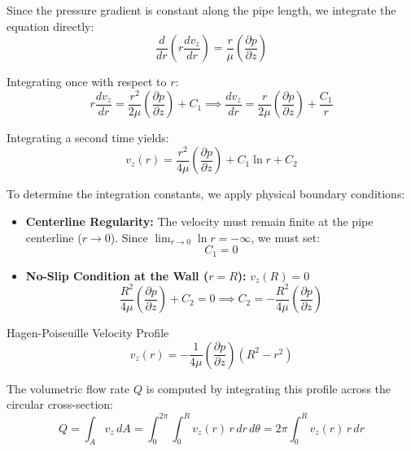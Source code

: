 Since the pressure gradient is constant along the pipe length, we integrate the equation directly:
\begin{equation}
\frac{d}{dr}\left( r \frac{d v_z}{dr} \right) = \frac{r}{\mu} \left(\frac{\partial p}{\partial z}\right)
\end{equation}

Integrating once with respect to $r$:
\begin{equation}
r \frac{d v_z}{dr} = \frac{r^2}{2\mu} \left(\frac{\partial p}{\partial z}\right) + C_1 \implies \frac{d v_z}{dr} = \frac{r}{2\mu} \left(\frac{\partial p}{\partial z}\right) + \frac{C_1}{r}
\end{equation}

Integrating a second time yields:
\begin{equation}
v_z(r) = \frac{r^2}{4\mu} \left(\frac{\partial p}{\partial z}\right) + C_1 \ln r + C_2
\end{equation}

To determine the integration constants, we apply physical boundary conditions:
\begin{itemize}
    \item \textbf{Centerline Regularity:} The velocity must remain finite at the pipe centerline ($r \to 0$). Since $\lim_{r\to0}\ln r = -\infty$, we must set:
    \begin{equation}
    C_1 = 0
    \end{equation}
    \item \textbf{No-Slip Condition at the Wall ($r=R$):} $v_z(R) = 0$
    \begin{equation}
    \frac{R^2}{4\mu} \left(\frac{\partial p}{\partial z}\right) + C_2 = 0 \implies C_2 = -\frac{R^2}{4\mu} \left(\frac{\partial p}{\partial z}\right)
    \end{equation}
\end{itemize}

\begin{eqbox}{Hagen-Poiseuille Velocity Profile}
\label{eq:hagen_poiseuille_profile}
\begin{equation}
v_z(r) = -\frac{1}{4\mu} \left(\frac{\partial p}{\partial z}\right) \left( R^2 - r^2 \right)
\end{equation}
\end{eqbox}

The volumetric flow rate $Q$ is computed by integrating this profile across the circular cross-section:
\begin{equation}
Q = \int_{A} v_z \, dA = \int_0^{2\pi} \int_0^R v_z(r) \, r \, dr \, d\theta = 2\pi \int_0^R v_z(r) \, r \, dr
\end{equation}

